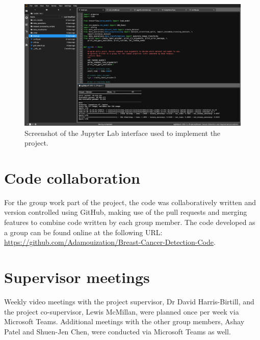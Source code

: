 \begin{figure}[ht]
\centerline{\includegraphics[width=\textwidth]{figures/appendix/jupyter_interface.png}}
\caption{\label{fig:appendix-jupyter_interface}Screenshot of the Jupyter Lab interface used to implement the project.}
\end{figure}

\section{Code collaboration}

For the group work part of the project, the code was collaboratively written and version controlled using GitHub, making use of the pull requests and merging features to combine code written by each group member. The code developed as a group can be found online at the following URL: \url{https://github.com/Adamouization/Breast-Cancer-Detection-Code}.

\section{Supervisor meetings}

Weekly video meetings with the project supervisor, Dr David Harris-Birtill, and the project co-supervisor, Lewis McMillan, were planned once per week via Microsoft Teams. Additional meetings with the other group members, Ashay Patel and Shuen-Jen Chen, were conducted via Microsoft Teams as well.